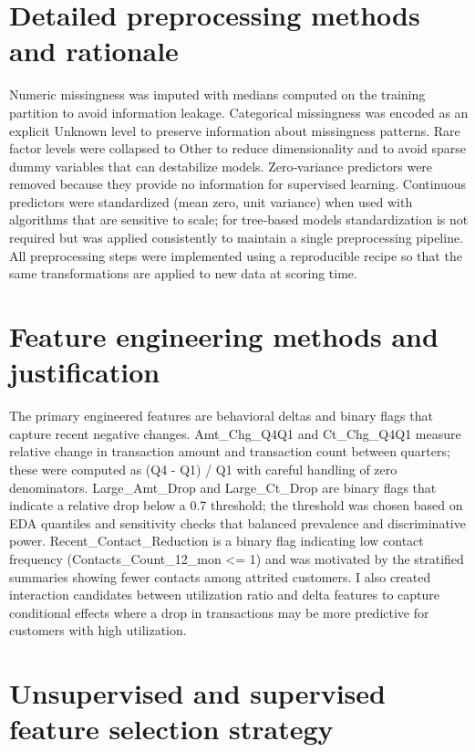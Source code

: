\documentclass[
  12pt,
]{article}
\begin{document}
\section{Detailed preprocessing methods and
rationale}\label{detailed-preprocessing-methods-and-rationale}

Numeric missingness was imputed with medians computed on the training
partition to avoid information leakage. Categorical missingness was
encoded as an explicit Unknown level to preserve information about
missingness patterns. Rare factor levels were collapsed to Other to
reduce dimensionality and to avoid sparse dummy variables that can
destabilize models. Zero‑variance predictors were removed because they
provide no information for supervised learning. Continuous predictors
were standardized (mean zero, unit variance) when used with algorithms
that are sensitive to scale; for tree‑based models standardization is
not required but was applied consistently to maintain a single
preprocessing pipeline. All preprocessing steps were implemented using a
reproducible recipe so that the same transformations are applied to new
data at scoring time.

\section{Feature engineering methods and
justification}\label{feature-engineering-methods-and-justification}

The primary engineered features are behavioral deltas and binary flags
that capture recent negative changes. Amt\_Chg\_Q4Q1 and Ct\_Chg\_Q4Q1
measure relative change in transaction amount and transaction count
between quarters; these were computed as (Q4 - Q1) / Q1 with careful
handling of zero denominators. Large\_Amt\_Drop and Large\_Ct\_Drop are
binary flags that indicate a relative drop below a 0.7 threshold; the
threshold was chosen based on EDA quantiles and sensitivity checks that
balanced prevalence and discriminative power. Recent\_Contact\_Reduction
is a binary flag indicating low contact frequency
(Contacts\_Count\_12\_mon \textless= 1) and was motivated by the
stratified summaries showing fewer contacts among attrited customers. I
also created interaction candidates between utilization ratio and delta
features to capture conditional effects where a drop in transactions may
be more predictive for customers with high utilization.

\section{Unsupervised and supervised feature selection
strategy}\label{unsupervised-and-supervised-feature-selection-strategy}
\end{document}
